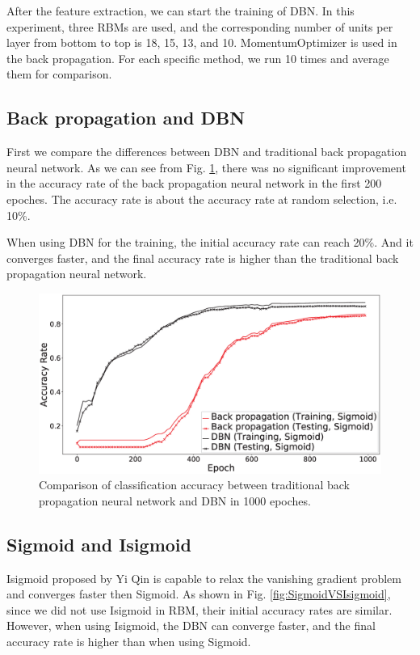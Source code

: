 \documentclass{modified}
\begin{document}
After the feature extraction, we can start the training of DBN. In this experiment, three RBMs are used, and the corresponding number of units per layer from bottom to top is 18, 15, 13, and 10. MomentumOptimizer is used in the back propagation. For each specific method, we run 10 times and average them for comparison.

\subsection{Back propagation and DBN}
First we compare the differences between DBN and traditional back propagation neural network. As we can see from Fig. \ref{fig:dbnVSbp}, there was no significant improvement in the accuracy rate of the back propagation neural network in the first 200 epoches. The accuracy rate is about the accuracy rate at random selection, i.e. 10\%. 

When using DBN for the training, the initial accuracy rate can reach 20\%. And it converges faster, and the final accuracy rate is higher than the traditional back propagation neural network.

\begin{figure}[htbp]
	\centering
	\includegraphics[width=\columnwidth]{dbnVSbp.eps}
	\caption{Comparison of classification accuracy between traditional back propagation neural network and DBN in 1000 epoches.}
	\label{fig:dbnVSbp}
\end{figure}

\subsection{Sigmoid and Isigmoid}
Isigmoid proposed by Yi Qin \cite{YiThe} is capable to relax the vanishing gradient problem and converges faster then Sigmoid. As shown in Fig. \ref{fig:SigmoidVSIsigmoid}, since we did not use Isigmoid in RBM, their initial accuracy rates are similar. However, when using Isigmoid, the DBN can converge faster, and the final accuracy rate is higher than when using Sigmoid.
\end{document}
